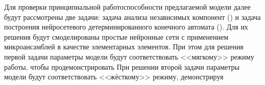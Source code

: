 Для проверки принципиальной работоспособности предлагаемой модели далее будут рассмотрены две задачи: задача анализа независимых компонент () и задача построения нейросетевого детерминированного конечного автомата (). Для их решения будут смоделированы простые нейронные сети с применением микроансамблей в качестве элементарных элементов. При этом для решения первой задачи параметры модели будут соответствовать <<мягкому>> режиму работы, чтобы продемонстрировать  При решении второй задачи параметры модели будут соответствовать <<жёсткому>> режиму, демонстрируя

%
%
%
